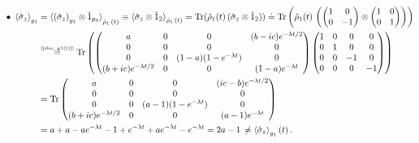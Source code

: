 \documentclass[11pt]{article}
\numberwithin{equation}{section} %
\numberwithin{figure}{section} %
\newcommand\numeq[1] %
  {\stackrel{\scriptscriptstyle(\mkern-1.5mu#1\mkern-1.5mu)}{=}}
\begin{document}
\begin{appendices}
\vspace{1cm}
\subsection{} 

\begin{equation} \label{sigmaz_otimes_one(t)_appendix}
\begin{split}
 \bullet\,\,\braket{\hat{\sigma}_z}_{g_1}
 &= \braket{ \left(\hat{\sigma}_z\right)_{g_1}\otimes \hat{1}_{p_0}}_{\hat{\rho}_1\,(t)} \equiv\braket{\hat{\sigma}_z\otimes\hat{1}_2}_{\hat{\rho}_1\,(t)}=\textrm{Tr}(\hat{\rho}_{1}(t)\,(\hat{\sigma}_z\otimes\hat{1}_2))\doteq \textrm{Tr}\begin{pmatrix}\hat{\rho}_{1}(t)\,\begin{pmatrix}\begin{pmatrix}1&0\\0&-1\end{pmatrix}\otimes\begin{pmatrix}1&0\\0&1\end{pmatrix}\end{pmatrix}\end{pmatrix}\\
 & \numeq{\textrm{\ref{rho_g1(t)}}} \textrm{Tr}\begin{pmatrix}\begin{pmatrix}a&0&0&(b-ic)e^{-\lambda t/2}\\0&0&0&0 \\ 0&0&(1-a)(1-e^{-\lambda t})&0 \\ (b+ic)e^{-\lambda t/2}&0&0&(1-a)e^{-\lambda t} \end{pmatrix}\begin{pmatrix}1&0&0&0\\0&1&0&0\\0&0&-1&0\\0&0&0&-1\end{pmatrix}\end{pmatrix}\\
 &=\textrm{Tr}\begin{pmatrix}a&0&0&(ic-b)e^{-\lambda t/2}\\0&0&0&0\\0&0&(a-1)(1-e^{-\lambda t})&0\\(b+ic)e^{-\lambda t/2}&0&0&(a-1)e^{-\lambda t}\end{pmatrix}\\
 &=a+a-ae^{-\lambda t}-1+e^{-\lambda t}+ae^{-\lambda t}-e^{-\lambda t}=2a-1\,\neq\braket{\hat{\sigma}_z}_{g_1}(t)\,\textrm{.}

\end{split}
\end{equation}
\end{appendices}
\end{document}
